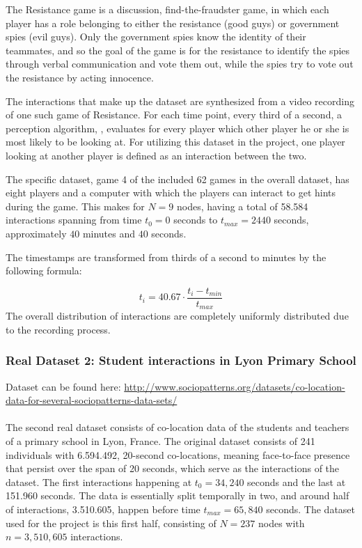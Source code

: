 The Resistance game is a discussion, find-the-fraudster game, in which each player has a role belonging to either the resistance (good guys) or government spies (evil guys).
Only the government spies know the identity of their teammates, and so the goal of the game is for the resistance to identify the spies through verbal communication and vote them out, while the spies try to vote out the resistance by acting innocence. 

The interactions that make up the dataset are synthesized from a video recording of one such game of Resistance.
For each time point, every third of a second, a perception algorithm, \cite{BaiPredictingVideos} \cite{Kumar2019PredictingNetworks}, evaluates for every player which other player he or she is most likely to be looking at.
For utilizing this dataset in the project, one player looking at another player is defined as an interaction between the two.

The specific dataset, game 4 of the included 62 games in the overall dataset, has eight players and a computer with which the players can interact to get hints during the game.
This makes for $N=9$ nodes, having a total of 58.584 interactions spanning from time $t_{0} = 0$ seconds to $t_{max} = 2440$ seconds, approximately $40$ minutes and $40$ seconds.

The timestamps are transformed from thirds of a second to minutes by the following formula:

\begin{equation}
    t_i = 40.67 \cdot \frac{t_i - t_{min}}{t_{max}}
\end{equation}
The overall distribution of interactions are completely uniformly distributed due to the recording process.



\subsubsection{Real Dataset 2: Student interactions in Lyon Primary School}
\label{sec:Data:RealData:RealDataset3}
Dataset can be found here: \href{http://www.sociopatterns.org/datasets/co-location-data-for-several-sociopatterns-data-sets/}{http://www.sociopatterns.org/datasets/co-location-data-for-several-sociopatterns-data-sets/}
\\\\
The second real dataset consists of co-location data of the students and teachers of a primary school in Lyon, France.
The original dataset consists of 241 individuals with 6.594.492, 20-second co-locations, meaning face-to-face presence that persist over the span of 20 seconds, which serve as the interactions of the dataset.
The first interactions happening at $t_{0} = 34,240$ seconds and the last at 151.960 seconds.
The data is essentially split temporally in two, and around half of interactions, 3.510.605, happen before time $t_{max} = 65,840$ seconds.
The dataset used for the project is this first half, consisting of $N = 237$ nodes with $n = 3,510,605$ interactions.


